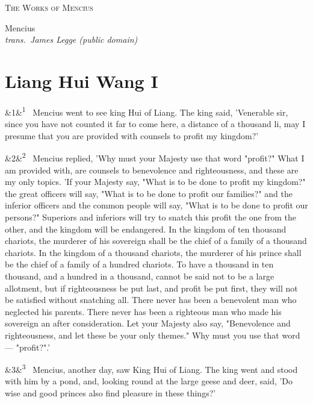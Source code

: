 \documentclass[12pt]{article}
\newcommand{\work}[1]{\begin{center}\LARGE\scshape #1\end{center}}
\newcommand{\attrib}[2]{\begin{center}\large #1\\[2pt]\small\itshape trans.\ #2\end{center}\vspace{1em}}
\newcommand{\para}[1][]{\par\noindent\ifx&#1&\else\textsuperscript{\footnotesize #1}~\fi}
\begin{document}
\work{The Works of Mencius}
\attrib{Mencius}{James Legge (public domain)}

\section*{Liang Hui Wang I}

\para[1] Mencius went to see king Hui of Liang. The king said, 'Venerable sir, since you have not counted it far to come here, a distance of a thousand li, may I presume that you are provided with counsels to profit my kingdom?'

\para[2] Mencius replied, 'Why must your Majesty use that word "profit?" What I am provided with, are counsels to benevolence and righteousness, and these are my only topics. 'If your Majesty say, "What is to be done to profit my kingdom?" the great officers will say, "What is to be done to profit our families?" and the inferior officers and the common people will say, "What is to be done to profit our persons?" Superiors and inferiors will try to snatch this profit the one from the other, and the kingdom will be endangered. In the kingdom of ten thousand chariots, the murderer of his sovereign shall be the chief of a family of a thousand chariots. In the kingdom of a thousand chariots, the murderer of his prince shall be the chief of a family of a hundred chariots. To have a thousand in ten thousand, and a hundred in a thousand, cannot be said not to be a large allotment, but if righteousness be put last, and profit be put first, they will not be satisfied without snatching all. There never has been a benevolent man who neglected his parents. There never has been a righteous man who made his sovereign an after consideration. Let your Majesty also say, "Benevolence and righteousness, and let these be your only themes." Why must you use that word --- "profit?".'

\para[3] Mencius, another day, saw King Hui of Liang. The king went and stood with him by a pond, and, looking round at the large geese and deer, said, 'Do wise and good princes also find pleasure in these things?'
\end{document}
